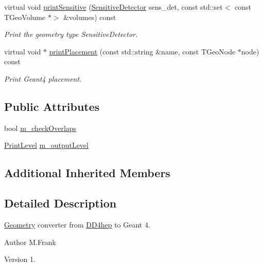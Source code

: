 \begin{DoxyCompactItemize}
virtual void \hyperlink{class_d_d4hep_1_1_simulation_1_1_geant4_converter_ac92f1e56c30c8924b22a47e06738daaa}{print\+Sensitive} (\hyperlink{class_d_d4hep_1_1_simulation_1_1_geant4_mapping_ae27ee51d13bf8ae59e8bee3fcecdbc85}{Sensitive\+Detector} sens\+\_\+det, const std\+::set$<$ const T\+Geo\+Volume $\ast$$>$ \&volumes) const
\begin{DoxyCompactList}\small\item\em Print the geometry type Sensitive\+Detector. \end{DoxyCompactList}\item 
virtual void $\ast$ \hyperlink{class_d_d4hep_1_1_simulation_1_1_geant4_converter_a2269a0b7dd982c40cfcdee82089870fe}{print\+Placement} (const std\+::string \&name, const T\+Geo\+Node $\ast$node) const
\begin{DoxyCompactList}\small\item\em Print Geant4 placement. \end{DoxyCompactList}\end{DoxyCompactItemize}
\subsection*{Public Attributes}
\begin{DoxyCompactItemize}
\item 
bool \hyperlink{class_d_d4hep_1_1_simulation_1_1_geant4_converter_a5afb918294afbed48b9c713f750fb017}{m\+\_\+check\+Overlaps}
\item 
\hyperlink{namespace_d_d4hep_a5b5a64d56252469451f2020a27d57d42}{Print\+Level} \hyperlink{class_d_d4hep_1_1_simulation_1_1_geant4_converter_a0beb45875a3be411994a235aa545dbbc}{m\+\_\+output\+Level}
\end{DoxyCompactItemize}
\subsection*{Additional Inherited Members}


\subsection{Detailed Description}
\hyperlink{namespace_d_d4hep_1_1_geometry}{Geometry} converter from \hyperlink{namespace_d_d4hep}{D\+D4hep} to Geant 4. 

\begin{DoxyAuthor}{Author}
M.\+Frank 
\end{DoxyAuthor}
\begin{DoxyVersion}{Version}
1. 
\end{DoxyVersion}


